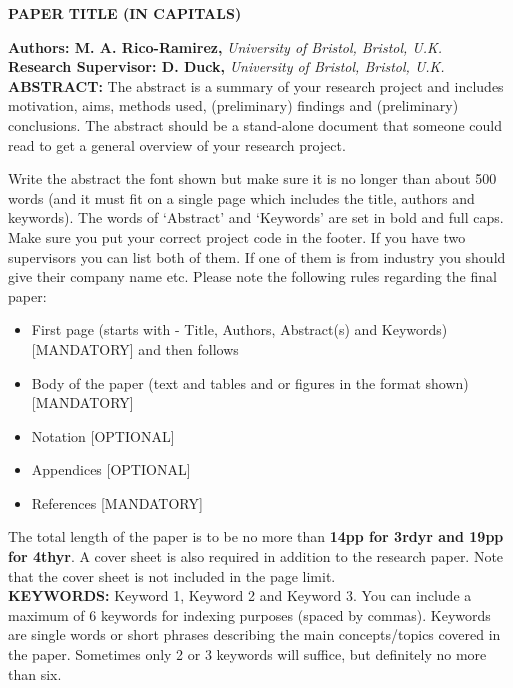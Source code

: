 \documentclass[a4paper,10pt]{article}
\begin{document}
\noindent 
\begin{center}
\textbf{{\Large PAPER TITLE (IN CAPITALS)}} \\
\end{center}

\noindent 
\textbf{Authors: M. A. Rico-Ramirez,} \textit{University of Bristol, Bristol, U.K.}
\\

\noindent 
\textbf{Research Supervisor: D. Duck,} \textit{University of Bristol, Bristol, U.K.}
\\

\noindent 
\textbf{ABSTRACT: } The abstract is a summary of your research project and includes motivation, aims, methods used, (preliminary) findings and (preliminary) conclusions.  The abstract should be a stand-alone document that someone could read to get a general overview of your research project.  

Write the abstract the font shown but make sure it is no longer than about 500 words (and it must fit on a single page which includes the title, authors and keywords). The words of ‘Abstract’ and ‘Keywords’ are set in bold and full caps.  Make sure you put your correct project code in the footer. If you have two supervisors you can list both of them.  If one of them is from industry you should give their company name etc.
Please note the following rules regarding the final paper:
\begin{itemize}
    \item First page (starts with - Title, Authors, Abstract(s) and Keywords) [MANDATORY] and then follows
    \item Body of the paper (text and tables and or figures in the format shown) [MANDATORY]
    \item Notation [OPTIONAL]
    \item Appendices [OPTIONAL]
    \item References [MANDATORY]
\end{itemize}

The total length of the paper is to be no more than \textbf{14pp for 3rdyr and 19pp for 4thyr}. A cover sheet is also required in addition to the research paper. Note that the cover sheet is not included in the page limit.
\\

\noindent 
\textbf{KEYWORDS:} Keyword 1, Keyword 2 and Keyword 3. You can include a maximum of 6 keywords for indexing purposes (spaced by commas). Keywords are single words or short phrases describing the main concepts/topics covered in the paper. Sometimes only 2 or 3 keywords will suffice, but definitely no more than six.
\\
\end{document}
